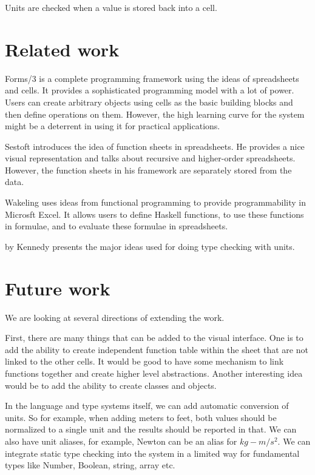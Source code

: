 \documentclass{acm_proc_article-sp}
\begin{document}
Units are checked when a value is stored back into a cell.

\section{Related work}

Forms/3 \cite{forms/3} is a complete programming framework using the ideas of spreadsheets and cells. It provides a sophisticated programming model with a lot of power. Users can create arbitrary objects using cells as the basic building blocks and then define operations on them. However, the high learning curve for the system might be a deterrent in using it for practical applications. 

Sestoft \cite{Sestoft} introduces the idea of function sheets in spreadsheets. He provides a nice visual representation and talks about recursive and higher-order spreadsheets. However, the function sheets in his framework are separately stored from the data. 

Wakeling \cite{Wakeling:2007:SFP:1194875.1194878} uses ideas from functional programming to provide programmability in Microsft Excel. It allows users to define Haskell functions, to use these functions in formulae, and to evaluate these formulae in spreadsheets. 

\cite{DBLP:conf/cefp/2009} by Kennedy presents the major ideas used for doing type checking with units.

\section{Future work}

We are looking at several directions of extending the work.

First, there are many things that can be added to the visual interface. One is to add the ability to create independent function table within the sheet that are not linked to the other cells. It would be good to have some mechanism to link functions together and create higher level abstractions. Another interesting idea would be to add the ability to create classes and objects.

In the language and type systems itself, we can add automatic conversion of units. So for example, when adding meters to feet, both values should be normalized to a single unit and the results should be reported in that. We can also have unit aliases, for example, Newton can be an alias for $kg-m/s^2$. We can integrate static type checking into the system in a limited way for fundamental types like Number, Boolean, string, array etc. 
\end{document}
